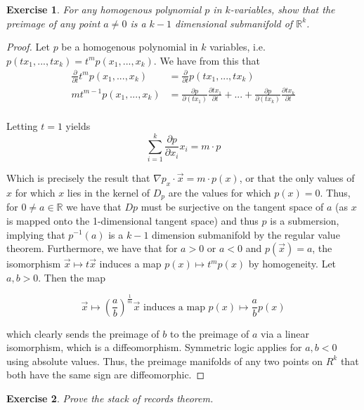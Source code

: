 \message{ !name(Homework3.tex)}\documentclass{article}
\newtheorem{exercise}{Exercise}
\begin{document}
  \begin{exercise}
    For any homogenous polynomial $p$ in $k$-variables, show that the preimage of any point $a \neq 0$ is a $k-1$ dimensional submanifold of $\mathbb{R}^{k}$.
  \end{exercise}
  \begin{proof}
    Let $p$ be a homogenous polynomial in $k$ variables, i.e. $p(tx_{1},...,tx_{k}) = t^{m}p(x_{1},...,x_{k})$. We have from this that
    \begin{align*}
      \frac{\partial}{\partial t} t^{m}p(x_{1},...,x_{k}) & = \frac{\partial}{\partial t} p(tx_{1},...,tx_{k}) \\
      mt^{m-1}p(x_{1},...,x_{k}) & = \frac{\partial p}{\partial (tx_{1})} \frac{\partial tx_{1}}{\partial t} + ... +  \frac{\partial p}{\partial (tx_{k})} \frac{\partial tx_{k}}{\partial t} \\
    \end{align*}

    Letting $t = 1$ yields
    \[
      \sum_{i=1}^{k} \frac{\partial p}{\partial x_{i}} x_{i} = m \cdot p
    \]

    Which is precisely the result that $\nabla p_{x} \cdot \vec{x} = m \cdot p(x)$, or that the only values of $x$ for which $x$ lies in the kernel of $D_{p}$ are the values for which $p(x) = 0$. Thus, for $0 \neq a \in \mathbb{R}$ we have that $Dp$ must be surjective on the tangent space of $a$ (as $x$ is mapped onto the 1-dimensional tangent space) and thus $p$ is a submersion, implying that $p^{-1}(a)$ is a $k-1$ dimension submanifold by the regular value theorem. Furthermore, we have that for $a > 0$ or $a < 0$ and $p(\vec{x}) = a$, the isomorphism $\vec{x} \mapsto t\vec{x}$ induces a map $p(x) \mapsto t^{m}p(x)$ by homogeneity. Let $a, b > 0$. Then the map

    \[
      \vec{x} \mapsto \left(\frac{a}{b}\right)^{\frac{1}{m}} \vec{x} \text{ induces a map } p(x) \mapsto \frac{a}{b} p(x)
    \]

    which clearly sends the preimage of $b$ to the preimage of $a$ via a linear isomorphism, which is a diffeomorphism. Symmetric logic applies for $a,b < 0$ using absolute values. Thus, the preimage manifolds of any two points on $R^{k}$ that both have the same sign are diffeomorphic.  
  \end{proof}

  \pagebreak

  \begin{exercise}
Prove the stack of records theorem.
    \end{exercise}
\end{document}
